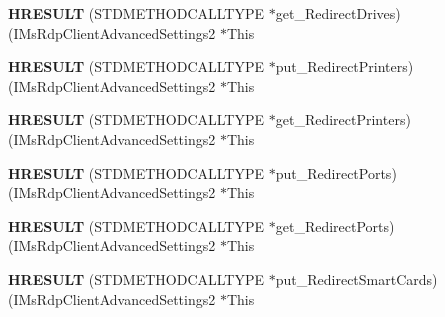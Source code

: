 \begin{DoxyCompactItemize}
\item 
\mbox{\label{struct_i_ms_rdp_client_advanced_settings2_vtbl_a634a01e88f1ccb9d2fb281c6439be7f2}} 
{\bfseries H\+R\+E\+S\+U\+LT} (S\+T\+D\+M\+E\+T\+H\+O\+D\+C\+A\+L\+L\+T\+Y\+PE $\ast$get\+\_\+\+Redirect\+Drives)(I\+Ms\+Rdp\+Client\+Advanced\+Settings2 $\ast$This
\item 
\mbox{\label{struct_i_ms_rdp_client_advanced_settings2_vtbl_a802a4672e09078f5c907dc28f019eefc}} 
{\bfseries H\+R\+E\+S\+U\+LT} (S\+T\+D\+M\+E\+T\+H\+O\+D\+C\+A\+L\+L\+T\+Y\+PE $\ast$put\+\_\+\+Redirect\+Printers)(I\+Ms\+Rdp\+Client\+Advanced\+Settings2 $\ast$This
\item 
\mbox{\label{struct_i_ms_rdp_client_advanced_settings2_vtbl_a0be3eae15510c26ea2f0f50634954287}} 
{\bfseries H\+R\+E\+S\+U\+LT} (S\+T\+D\+M\+E\+T\+H\+O\+D\+C\+A\+L\+L\+T\+Y\+PE $\ast$get\+\_\+\+Redirect\+Printers)(I\+Ms\+Rdp\+Client\+Advanced\+Settings2 $\ast$This
\item 
\mbox{\label{struct_i_ms_rdp_client_advanced_settings2_vtbl_a31918999a4333d3b4303096510da6de3}} 
{\bfseries H\+R\+E\+S\+U\+LT} (S\+T\+D\+M\+E\+T\+H\+O\+D\+C\+A\+L\+L\+T\+Y\+PE $\ast$put\+\_\+\+Redirect\+Ports)(I\+Ms\+Rdp\+Client\+Advanced\+Settings2 $\ast$This
\item 
\mbox{\label{struct_i_ms_rdp_client_advanced_settings2_vtbl_a984245411f32c4bbc0f67bb3f750238e}} 
{\bfseries H\+R\+E\+S\+U\+LT} (S\+T\+D\+M\+E\+T\+H\+O\+D\+C\+A\+L\+L\+T\+Y\+PE $\ast$get\+\_\+\+Redirect\+Ports)(I\+Ms\+Rdp\+Client\+Advanced\+Settings2 $\ast$This
\item 
\mbox{\label{struct_i_ms_rdp_client_advanced_settings2_vtbl_a47e7afefd4931bca4445eba33cc61af0}} 
{\bfseries H\+R\+E\+S\+U\+LT} (S\+T\+D\+M\+E\+T\+H\+O\+D\+C\+A\+L\+L\+T\+Y\+PE $\ast$put\+\_\+\+Redirect\+Smart\+Cards)(I\+Ms\+Rdp\+Client\+Advanced\+Settings2 $\ast$This
\item 
\mbox{\label{struct_i_ms_rdp_client_advanced_settings2_vtbl_a189bf30257fe71238ab0ed2df05819fa}} 

\end{DoxyCompactItemize}
